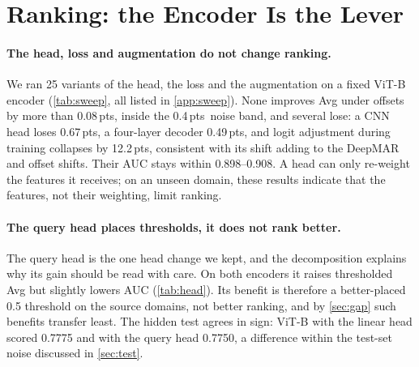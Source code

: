 \documentclass[10pt,twocolumn,letterpaper]{article}
\newcommand{\pts}{\,pts}
\begin{document}
\section{Ranking: the Encoder Is the Lever}
\label{sec:ranking}

\paragraph{The head, loss and augmentation do not change ranking.} We ran 25 variants of the head, the loss and the augmentation on a fixed ViT-B encoder (\cref{tab:sweep}, all listed in \cref{app:sweep}). None improves Avg under offsets by more than 0.08\pts, inside the 0.4\pts\ noise band, and several lose: a CNN head loses 0.67\pts, a four-layer decoder 0.49\pts, and logit adjustment during training collapses by 12.2\pts, consistent with its shift adding to the DeepMAR and offset shifts. Their AUC stays within 0.898--0.908. A head can only re-weight the features it receives; on an unseen domain, these results indicate that the features, not their weighting, limit ranking.

\begin{table}[t]
\centering\small
\setlength{\tabcolsep}{4pt}
\caption{Avg change (offsets, pts) relative to the query head on ViT-B (0.7958, mean of two runs). No variant leaves the noise band upwards.}
\label{tab:sweep}
\end{table}

\paragraph{The query head places thresholds, it does not rank better.} The query head is the one head change we kept, and the decomposition explains why its gain should be read with care. On both encoders it raises thresholded Avg but slightly lowers AUC (\cref{tab:head}). Its benefit is therefore a better-placed 0.5 threshold on the source domains, not better ranking, and by \cref{sec:gap} such benefits transfer least. The hidden test agrees in sign: ViT-B with the linear head scored 0.7775 and with the query head 0.7750, a difference within the test-set noise discussed in \cref{sec:test}.
\end{document}
